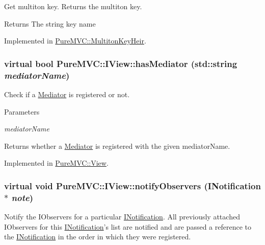 Get multiton key. Returns the multiton key. \begin{DoxyReturn}{Returns}
The string key name 
\end{DoxyReturn}


Implemented in \hyperlink{class_pure_m_v_c_1_1_multiton_key_heir_aa5622459d33380deb08dc3cab8b991c7}{PureMVC::MultitonKeyHeir}.\hypertarget{class_pure_m_v_c_1_1_i_view_a04387bea6dd82b8a34ea47b51938ccc5}{
\subsubsection[{hasMediator}]{\setlength{\rightskip}{0pt plus 5cm}virtual bool PureMVC::IView::hasMediator (std::string {\em mediatorName})}}
\label{class_pure_m_v_c_1_1_i_view_a04387bea6dd82b8a34ea47b51938ccc5}


Check if a \hyperlink{class_pure_m_v_c_1_1_mediator}{Mediator} is registered or not. 
\begin{DoxyParams}{Parameters}
\item[{\em mediatorName}]\end{DoxyParams}
\begin{DoxyReturn}{Returns}
whether a \hyperlink{class_pure_m_v_c_1_1_mediator}{Mediator} is registered with the given {\ttfamily mediatorName}. 
\end{DoxyReturn}


Implemented in \hyperlink{class_pure_m_v_c_1_1_view_a5af9aeea286647436cf595d0a946711f}{PureMVC::View}.\hypertarget{class_pure_m_v_c_1_1_i_view_aa0123eeed26fc15fe067e3171936d143}{
\subsubsection[{notifyObservers}]{\setlength{\rightskip}{0pt plus 5cm}virtual void PureMVC::IView::notifyObservers ({\bf INotification} $\ast$ {\em note})}}
\label{class_pure_m_v_c_1_1_i_view_aa0123eeed26fc15fe067e3171936d143}


Notify the {\ttfamily IObservers} for a particular {\ttfamily \hyperlink{class_pure_m_v_c_1_1_i_notification}{INotification}}. All previously attached {\ttfamily IObservers} for this {\ttfamily \hyperlink{class_pure_m_v_c_1_1_i_notification}{INotification}}'s list are notified and are passed a reference to the {\ttfamily \hyperlink{class_pure_m_v_c_1_1_i_notification}{INotification}} in the order in which they were registered.


